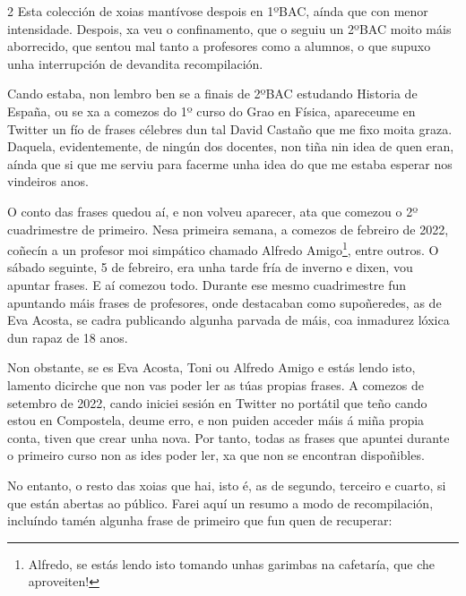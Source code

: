 \begin{multicols}{2}
Esta colección de xoias mantívose despois en 1ºBAC, aínda que con menor
intensidade. Despois, xa veu o confinamento, que o seguiu un 2ºBAC moito máis
aborrecido, que sentou mal tanto a profesores como a alumnos, o que supuxo unha
interrupción de devandita recompilación.

Cando estaba, non lembro ben se a finais de 2ºBAC estudando Historia de España,
ou se xa a comezos do 1º curso do Grao en Física, apareceume en Twitter un fío
de frases célebres dun tal David Castaño que me fixo moita graza. Daquela,
evidentemente, de ningún dos docentes, non tiña nin idea de quen eran, aínda
que si que me serviu para facerme unha idea do que me estaba esperar nos
vindeiros anos.

O conto das frases quedou aí, e non volveu aparecer, ata que comezou o 2º
cuadrimestre de primeiro. Nesa primeira semana, a comezos de febreiro de 2022,
coñecín a un profesor moi simpático chamado Alfredo Amigo\footnote{Alfredo, se
estás lendo isto tomando unhas garimbas na cafetaría, que che aproveiten!},
entre outros. O sábado seguinte, 5 de febreiro, era unha tarde fría de inverno
e dixen, vou apuntar frases. E aí comezou todo. Durante ese mesmo cuadrimestre
fun apuntando máis frases de profesores, onde destacaban como supoñeredes, as
de Eva Acosta, se cadra publicando algunha parvada de máis, coa inmadurez
lóxica dun rapaz de 18 anos.

Non obstante, se es Eva Acosta, Toni ou Alfredo Amigo e estás lendo isto,
lamento dicirche que non vas poder ler as túas propias frases. A comezos de
setembro de 2022, cando iniciei sesión en Twitter no portátil que teño cando
estou en Compostela, deume erro, e non puiden acceder máis á miña propia conta,
tiven que crear unha nova. Por tanto, todas as frases que apuntei durante o
primeiro curso non as ides poder ler, xa que non se encontran dispoñibles.

No entanto, o resto das xoias que hai, isto é, as de segundo, terceiro e
cuarto, si que están abertas ao público. Farei aquí un resumo a modo de
recompilación, incluíndo tamén algunha frase de primeiro que fun quen de
recuperar:




\end{multicols}
